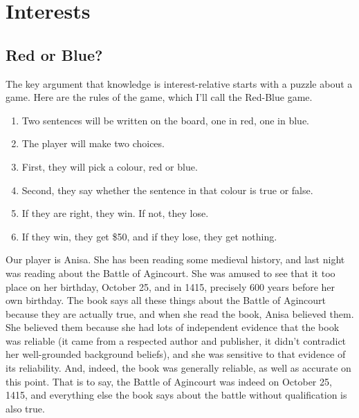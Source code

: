 \documentclass[
  12pt,
  letterpaper,
]{scrbook}
\providecommand{\tightlist}{%
  \setlength{\itemsep}{0pt}\setlength{\parskip}{0pt}}\usepackage{longtable,booktabs,array}
\begin{document}

\chapter{Interests}\label{sec-interests}

\section{Red or Blue?}\label{sec-redblue}

The key argument that knowledge is interest-relative starts with a
puzzle about a game. Here are the rules of the game, which I'll call the
Red-Blue game.

\begin{enumerate}
\def\labelenumi{\arabic{enumi}.}
\tightlist
\item
  Two sentences will be written on the board, one in red, one in blue.
\item
  The player will make two choices.
\item
  First, they will pick a colour, red or blue.
\item
  Second, they say whether the sentence in that colour is true or false.
\item
  If they are right, they win. If not, they lose.
\item
  If they win, they get \$50, and if they lose, they get nothing.
\end{enumerate}

Our player is Anisa. She has been reading some medieval history, and
last night was reading about the Battle of Agincourt. She was amused to
see that it too place on her birthday, October 25, and in 1415,
precisely 600 years before her own birthday. The book says all these
things about the Battle of Agincourt because they are actually true, and
when she read the book, Anisa believed them. She believed them because
she had lots of independent evidence that the book was reliable (it came
from a respected author and publisher, it didn't contradict her
well-grounded background beliefs), and she was sensitive to that
evidence of its reliability. And, indeed, the book was generally
reliable, as well as accurate on this point. That is to say, the Battle
of Agincourt was indeed on October 25, 1415, and everything else the
book says about the battle without qualification is also true.
\end{document}
